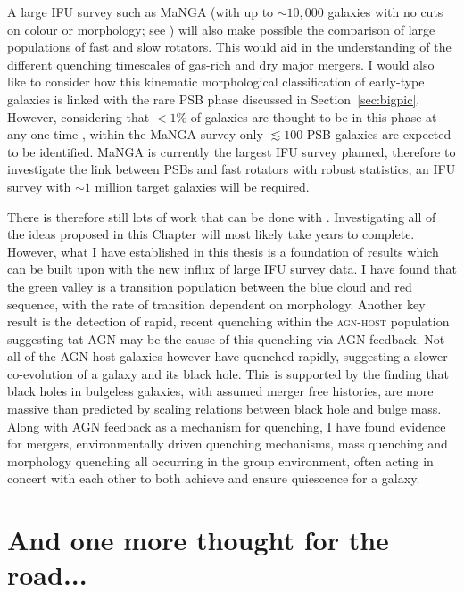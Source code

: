A large IFU survey such as MaNGA (with up to $\sim10,000$ galaxies with no cuts on colour or morphology; see \citealt{bundy15}) will also make possible the comparison of large populations of fast and slow rotators. This would aid in the understanding of the different quenching timescales of gas-rich and dry major mergers. I would also like to consider how this kinematic morphological classification of early-type galaxies is linked with the rare PSB phase discussed in Section~\ref{sec:bigpic}. However, considering that $<1\%$ of galaxies are thought to be in this phase at any one time \citep{Wong12, wild16}, within the MaNGA survey only $\lesssim100$ PSB galaxies are expected to be identified. MaNGA is currently the largest IFU survey planned, therefore to investigate the link between PSBs and fast rotators with robust statistics, an IFU survey with $\sim 1$ million target galaxies will be required. 

There is therefore still lots of work that can be done with \starpy. Investigating all of the ideas proposed in this Chapter will most likely take years to complete. However, what I have established in this thesis is a foundation of results which can be built upon with the new influx of large IFU survey data. I have found that the green valley is a transition population between the blue cloud and red sequence, with the rate of transition dependent on morphology. Another key result is the detection of rapid, recent quenching within the \textsc{agn-host} population suggesting tat AGN may be the cause of this quenching via AGN feedback. Not all of the AGN host galaxies however have quenched rapidly, suggesting a slower co-evolution of a galaxy and its black hole. This is supported by the finding that black holes in bulgeless galaxies, with assumed merger free histories, are more massive than predicted by scaling relations between black hole and bulge mass. Along with AGN feedback as a mechanism for quenching, I have found evidence for mergers, environmentally driven quenching mechanisms, mass quenching and morphology quenching all occurring in the group environment, often acting in concert with each other to both achieve and ensure quiescence for a galaxy. 

\section{And one more thought for the road...}\label{sec:hst}


